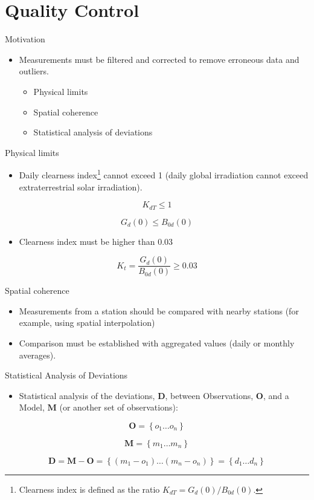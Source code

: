 \documentclass[xcolor={usenames,svgnames,dvipsnames}]{beamer}
\begin{document}
\section{Quality Control}
\label{sec:org20e8c25}
\begin{frame}[label={sec:org7fb50a5}]{Motivation}
\begin{itemize}
\item Measurements must be filtered and corrected to remove erroneous data and outliers.
\begin{itemize}
\item Physical limits
\item Spatial coherence
\item Statistical analysis of deviations
\end{itemize}
\end{itemize}
\end{frame}


\begin{frame}[label={sec:org4c72342}]{Physical limits}
\begin{itemize}
\item Daily clearness index\footnote{Clearness index is defined as the ratio \(K_{dT} = G_d(0) / B_{0d}(0)\).} cannot exceed 1 (daily global irradiation cannot exceed extraterrestrial solar irradiation).
\end{itemize}
\[
  K_{dT} \leq 1
\]

\[
G_d(0) \leq B_{0d}(0)
\]

\begin{itemize}
\item Clearness index must be higher than 0.03
\end{itemize}
\[
K_t = \frac{G_d(0)}{B_{0d}(0)} \geq 0.03
\]
\end{frame}

\begin{frame}[label={sec:org3371feb}]{Spatial coherence}
\begin{itemize}
\item Measurements from a station should be compared with \alert{nearby stations} (for example, using spatial interpolation)
\item Comparison must be established with \alert{aggregated values} (daily or monthly averages).
\end{itemize}
\end{frame}

\begin{frame}[label={sec:org511fa6c}]{Statistical Analysis of Deviations}
\begin{itemize}
\item Statistical analysis of the deviations, \(\mathbf{D}\), between Observations, \(\mathbf{O}\), and a Model, \(\mathbf{M}\) (or another set of observations):
\end{itemize}

\[
\mathbf{O} = \left\{ o_1 \dots o_n \right\}
\]

\[
\mathbf{M} = \left\{ m_1 \dots m_n  \right\}
\]

\[
\mathbf{D} = \mathbf{M} - \mathbf{O} =  \left\{ (m_1 - o_1) \dots (m_n - o_n)  \right\} = \left\{ d_1 \dots d_n  \right\}
\]
\end{frame}
\end{document}
